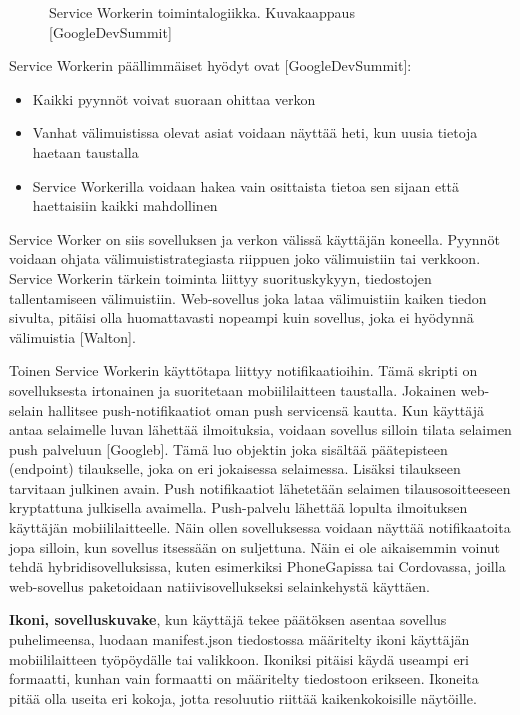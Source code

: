 \documentclass{tktltiki}
\begin{document}
\begin{figure}[h]
\begin{center}
\caption{Service Workerin toimintalogiikka. Kuvakaappaus [GoogleDevSummit] }
\label{Service workerin toiminta}
\end{center}
\end{figure}
\clearpage

Service Workerin päällimmäiset hyödyt ovat [GoogleDevSummit]:

\begin{itemize}
  \item Kaikki pyynnöt voivat suoraan ohittaa verkon
  \item Vanhat välimuistissa olevat asiat voidaan näyttää heti, kun uusia tietoja haetaan taustalla
  \item Service Workerilla voidaan hakea vain osittaista tietoa sen sijaan että haettaisiin kaikki mahdollinen
\end{itemize}

Service Worker on siis sovelluksen ja verkon välissä käyttäjän koneella. Pyynnöt voidaan ohjata välimuististrategiasta riippuen joko välimuistiin tai verkkoon. Service Workerin tärkein toiminta liittyy suorituskykyyn, tiedostojen tallentamiseen välimuistiin. Web-sovellus joka lataa välimuistiin kaiken tiedon sivulta, pitäisi olla huomattavasti nopeampi kuin sovellus, joka ei hyödynnä välimuistia [Walton].

Toinen Service Workerin käyttötapa liittyy notifikaatioihin. Tämä skripti on sovelluksesta irtonainen ja suoritetaan mobiililaitteen taustalla. Jokainen web-selain hallitsee push-notifikaatiot oman push servicensä kautta. Kun käyttäjä antaa selaimelle luvan lähettää ilmoituksia, voidaan sovellus silloin tilata selaimen push palveluun [Googleb]. Tämä luo objektin joka sisältää päätepisteen (endpoint) tilaukselle, joka on eri jokaisessa selaimessa. Lisäksi tilaukseen tarvitaan julkinen avain. Push notifikaatiot lähetetään selaimen tilausosoitteeseen kryptattuna julkisella avaimella. Push-palvelu lähettää lopulta ilmoituksen käyttäjän mobiililaitteelle. Näin ollen sovelluksessa voidaan näyttää notifikaatoita jopa silloin, kun sovellus itsessään on suljettuna. Näin ei ole aikaisemmin voinut tehdä hybridisovelluksissa, kuten esimerkiksi PhoneGapissa tai Cordovassa, joilla web-sovellus paketoidaan natiivisovellukseksi selainkehystä käyttäen.

\textbf{Ikoni, sovelluskuvake}, kun käyttäjä tekee päätöksen asentaa sovellus puhelimeensa, luodaan manifest.json tiedostossa määritelty ikoni käyttäjän mobiililaitteen työpöydälle tai valikkoon. Ikoniksi pitäisi käydä useampi eri formaatti, kunhan vain formaatti on määritelty tiedostoon erikseen. Ikoneita pitää olla useita eri kokoja, jotta resoluutio riittää kaikenkokoisille näytöille.
\end{document}
